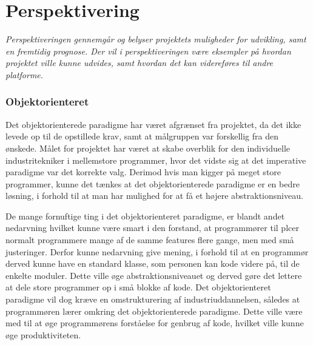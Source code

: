 \chapter{Perspektivering}
\label{sec:Perspektivering}
\textit{Perspektiveringen gennemgår og belyser projektets muligheder for udvikling, samt en fremtidig prognose.
Der vil i perspektiveringen være eksempler på hvordan projektet ville kunne udvides, samt hvordan det kan videreføres til andre platforme.
}

\subsection*{Objektorienteret}
Det objektorienterede paradigme har været afgrænset fra projektet, da det ikke levede op til de opstillede krav, samt at målgruppen var forskellig fra den ønskede.
Målet for projektet har været at skabe overblik for den individuelle industritekniker i mellemstore programmer, hvor det vidste sig at det imperative paradigme var det korrekte valg.
Derimod hvis man kigger på meget store programmer, kunne det tænkes at det objektorienterede paradigme er en bedre løsning, i forhold til at man har mulighed for at få et højere abstraktionsniveau.

De mange fornuftige ting i det objektorienteret paradigme, er blandt andet nedarvning hvilket kunne være smart i den forstand, at programmører til \gls{plc}er normalt programmere mange af de samme features flere gange, men med små justeringer.
Derfor kunne nedarvning give mening, i forhold til at en programmør derved kunne have en standard klasse, som personen kan kode videre på, til de enkelte moduler.
Dette ville øge abstraktionsniveauet og derved gøre det lettere at dele store programmer op i små blokke af kode.
Det objektorienteret paradigme vil dog kræve en omstrukturering af industriuddannelsen, således at programmøren lærer omkring det objektorienterede paradigme.
Dette ville være med til at øge programmørens forståelse for genbrug af kode, hvilket ville kunne øge produktiviteten.

